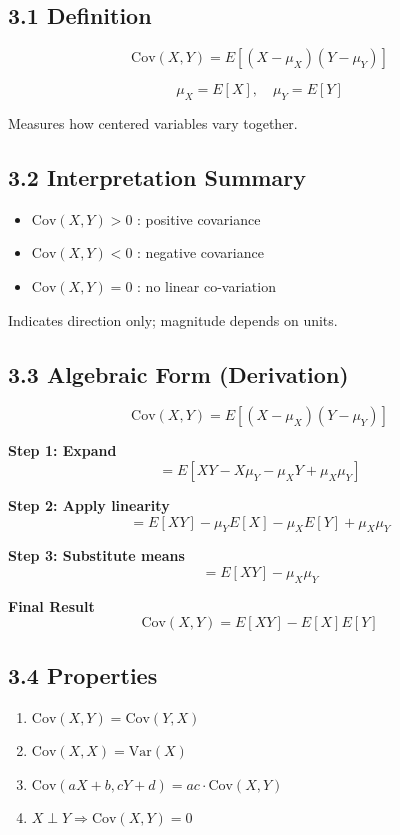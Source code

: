 \documentclass[12pt]{article}
\begin{document}
\subsection*{3.1 Definition}

\[
\text{Cov}(X,Y) = E[(X - \mu_X)(Y - \mu_Y)]
\]

\[
\mu_X = E[X], \quad \mu_Y = E[Y]
\]

Measures how centered variables vary together.

\subsection*{3.2 Interpretation Summary}

\begin{itemize}
    \item $\text{Cov}(X,Y) > 0$ : positive covariance
    \item $\text{Cov}(X,Y) < 0$ : negative covariance
    \item $\text{Cov}(X,Y) = 0$ : no linear co-variation
\end{itemize}

Indicates direction only; magnitude depends on units.

\subsection*{3.3 Algebraic Form (Derivation)}

\[
\text{Cov}(X,Y) = E[(X - \mu_X)(Y - \mu_Y)]
\]

\textbf{Step 1: Expand}
\[
= E[XY - X\mu_Y - \mu_X Y + \mu_X \mu_Y]
\]

\textbf{Step 2: Apply linearity}
\[
= E[XY] - \mu_Y E[X] - \mu_X E[Y] + \mu_X \mu_Y
\]

\textbf{Step 3: Substitute means}
\[
= E[XY] - \mu_X \mu_Y
\]

\textbf{Final Result}
\[
\boxed{\text{Cov}(X,Y) = E[XY] - E[X]E[Y]}
\]

\subsection*{3.4 Properties}

\begin{enumerate}
    \item $\text{Cov}(X,Y) = \text{Cov}(Y,X)$
    \item $\text{Cov}(X,X) = \text{Var}(X)$
    \item $\text{Cov}(aX + b, cY + d) = ac \cdot \text{Cov}(X,Y)$
    \item $X \perp Y \Rightarrow \text{Cov}(X,Y) = 0$
\end{enumerate}
\end{document}
